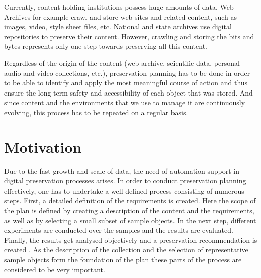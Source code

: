 Currently, content holding institutions possess huge amounts of data. Web Archives for example crawl and store web sites and related content, such as images, video, style sheet files, etc. National and state archives use digital repositories to preserve their content. However, crawling and storing the bits and bytes represents only one step towards preserving all this content.

Regardless of the origin of the content (web archive, scientific data, personal audio and video collections, etc.), preservation planning has to be done in order to be able to identify and apply the most meaningful course of action and thus ensure the long-term safety and accessibility of each object that was stored. And since content and the environments that we use to manage it are continuously evolving, this process has to be repeated on a regular basis.

\section{Motivation}
\label{sec:motivation}
Due to the fast growth and scale of data, the need of automation support in digital preservation processes arises. In order to conduct preservation planning effectively, one has to undertake a well-defined process consisting of numerous steps. First, a detailed definition of the requirements is created. Here the scope of the plan is defined by creating a description of the content and the requirements, as well as by selecting a small subset of sample objects. In the next step, different experiments are conducted over the samples and the results are evaluated. Finally, the results get analysed objectively and a preservation recommendation is created \cite{Becker:2009fk}. As the description of the collection and the selection of representative sample objects form the foundation of the plan these parts of the process are considered to be very important.

